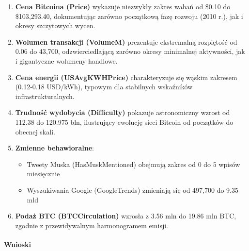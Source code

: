 \documentclass[
  11pt,
]{article}
\providecommand{\tightlist}{%
  \setlength{\itemsep}{0pt}\setlength{\parskip}{0pt}}
\begin{document}
\begin{enumerate}
\def\labelenumi{\arabic{enumi}.}
\item
  \textbf{Cena Bitcoina (Price)} wykazuje niezwykły zakres wahań od
  \$0.10 do \$103,293.40, dokumentując zarówno początkową fazę rozwoju
  (2010 r.), jak i okresy szczytowych wycen.
\item
  \textbf{Wolumen transakcji (VolumeM)} prezentuje ekstremalną
  rozpiętość od 0.06 do 43,700, odzwierciedlającą zarówno okresy
  minimalnej aktywności, jak i gigantyczne wolumeny handlowe.
\item
  \textbf{Cena energii (USAvgKWHPrice)} charakteryzuje się wąskim
  zakresem (0.12-0.18 USD/kWh), typowym dla stabilnych wskaźników
  infrastrukturalnych.
\item
  \textbf{Trudność wydobycia (Difficulty)} pokazuje astronomiczny wzrost
  od 112.38 do 120.975 bln, ilustrujący ewolucję sieci Bitcoin od
  początków do obecnej skali.
\item
  \textbf{Zmienne behawioralne}:

  \begin{itemize}
  \tightlist
  \item
    Tweety Muska (HasMuskMentioned) obejmują zakres od 0 do 5 wpisów
    miesięcznie
  \item
    Wyszukiwania Google (GoogleTrends) zmieniają się od 497,700 do 9.35
    mld
  \end{itemize}
\item
  \textbf{Podaż BTC (BTCCirculation)} wzrosła z 3.56 mln do 19.86 mln
  BTC, zgodnie z przewidywalnym harmonogramem emisji.
\end{enumerate}

\paragraph{Wnioski}\label{wnioski-5}
\end{document}
